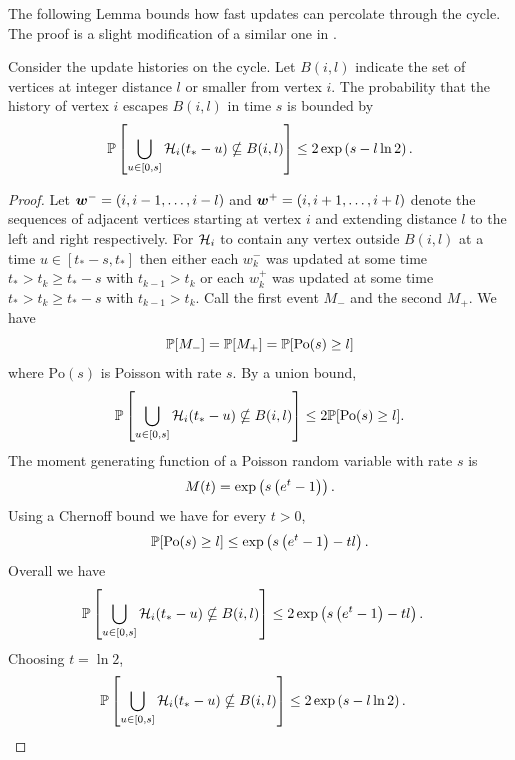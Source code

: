 	The following Lemma bounds how fast updates can percolate through the cycle. The proof is a slight modification of a similar one in \cite{Lubetzky2016-wd}.
	\begin{lemma}
	\label{lem:1D prob history contained in ball}
		Consider the update histories on the cycle.	Let $B(i, l)$ indicate the set of vertices at integer distance $l$ or smaller from vertex $i$. The probability that the history of vertex $i$ escapes $B(i,l)$ in time $s$ is bounded by
		\begin{equation}
			\mathbb{P}\left[\bigcup_{u \in [0, s]}\mathcal{H}_i(t_* - u) \nsubseteq B(i, l)\right] \leq 2\exp\left(s - l \ln 2 \right).
		\end{equation}
	\end{lemma}
	\begin{proof}
		Let ${\bm{{w}}}^- = (i, i-1, \dots, i- l)$ and ${\bm{{w}}}^+ = (i, i+1, \dots, i+ l)$ denote the sequences of adjacent vertices starting at vertex $i$ and extending distance $l$ to the left and right respectively. For $\mathcal{H}_i$ to contain any vertex outside $B(i, l)$ at a time $u \in [t_* - s, t_*]$ then either each $w_k^-$ was updated at some time $t_* > t_k \geq t_* - s$ with $t_{k-1} > t_k$ or each $w_k^+$ was updated at some time $t_* > t_k \geq t_* - s$ with $t_{k-1} > t_k$. Call the first event $M_-$ and the second $M_+$. We have
		\begin{equation}
			\mathbb{P}[M_-] = \mathbb{P}[M_+] = \mathbb{P}[\mathrm{Po}(s) \geq  l ]
		\end{equation}
		where $\mathrm{Po}(s)$ is Poisson with rate $s$. By a union bound,
		\begin{equation}
			\mathbb{P}\left[\bigcup_{u \in [0, s]}\mathcal{H}_i(t_* - u) \nsubseteq B(i, l)\right] \leq 2 \mathbb{P}[\mathrm{Po}(s) \geq  l].
		\end{equation}
		The moment generating function of a Poisson random variable with rate $s$ is
		\begin{equation}
			M(t) = \exp\left(s\left(e^t - 1\right)\right).
		\end{equation}
		Using a Chernoff bound we have for every $t > 0$,
		\begin{equation}
			\mathbb{P}[\mathrm{Po}(s) \geq l] \leq \exp\left(s\left(e^t - 1\right) - t l\right).
		\end{equation}
		Overall we have
		\begin{align}
			\mathbb{P}\left[\bigcup_{u \in [0, s]}\mathcal{H}_i(t_* - u) \nsubseteq B(i, l)\right] &\leq 2\exp\left(s\left(e^t - 1\right) - t l\right).
		\end{align}
		Choosing $t = \ln 2$,
		\begin{align}
			\prob\left[\bigcup_{u \in [0, s]}\mathcal{H}_i(t_* - u) \nsubseteq B(i, l)\right] &\leq 2\exp\left(s - l \ln 2 \right).%
		\end{align}
	\end{proof}


